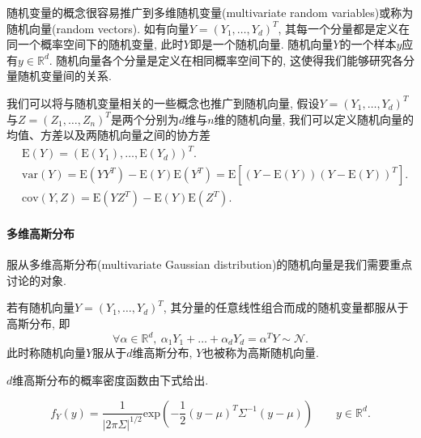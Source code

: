                 随机变量的概念很容易推广到多维随机变量(multivariate random variables)或称为随机向量(random vectors). 如有向量$Y=(Y_{1},\dots,Y_{d})^{T}$, 其每一个分量都是定义在同一个概率空间下的随机变量, 此时$Y$即是一个随机向量. 随机向量$Y$的一个样本$y$应有$y\in\mathds{R}^{d}$. 随机向量各个分量是定义在相同概率空间下的, 这使得我们能够研究各分量随机变量间的关系.

                我们可以将与随机变量相关的一些概念也推广到随机向量, 假设$Y=(Y_{1},\dots,Y_{d})^{T}$与$Z=(Z_{1},\dots,Z_{n})^{T}$是两个分别为$d$维与$n$维的随机向量, 我们可以定义随机向量的均值、方差以及两随机向量之间的协方差
                \begin{align}
                    &\mathrm{E}(Y)=(\mathrm{E}(Y_{1}),\dots,\mathrm{E}(Y_{d}))^{T}. \\
                    &\mathrm{var}(Y)=\mathrm{E}(YY^{T})-\mathrm{E}(Y)\mathrm{E}(Y^{T})=\mathrm{E}[(Y-\mathrm{E}(Y))(Y-\mathrm{E}(Y))^{T}]. \\
                    &\mathrm{cov}(Y, Z)=\mathrm{E}(YZ^{T})-\mathrm{E}(Y)\mathrm{E}(Z^{T}).
                \end{align}

            \paragraph{多维高斯分布}
                服从多维高斯分布(multivariate Gaussian distribution)的随机向量是我们需要重点讨论的对象.

                \begin{definition}[多维高斯分布]      
                    若有随机向量$Y=(Y_{1},\dots,Y_{d})^{T}$, 其分量的任意线性组合而成的随机变量都服从于高斯分布, 即
                    \begin{equation}
                        \forall\alpha\in\mathds{R}^{d},\ \alpha_{1}Y_{1}+\dots+\alpha_{d}Y_{d}=\alpha^{T}Y\sim\mathcal{N}.
                    \end{equation}
                    此时称随机向量$Y$服从于$d$维高斯分布, $Y$也被称为高斯随机向量.
                \end{definition}

                $d$维高斯分布的概率密度函数由下式给出.

                \begin{equation}
                    f_{Y}(y)=\frac{1}{|2\pi\Sigma|^{1/2}}\mathrm{exp}\left(-\frac{1}{2}(y-\mu)^{T}\Sigma^{-1}(y-\mu)\right) \qquad y\in\mathds{R}^{d}. \label{2.6}
                \end{equation}

